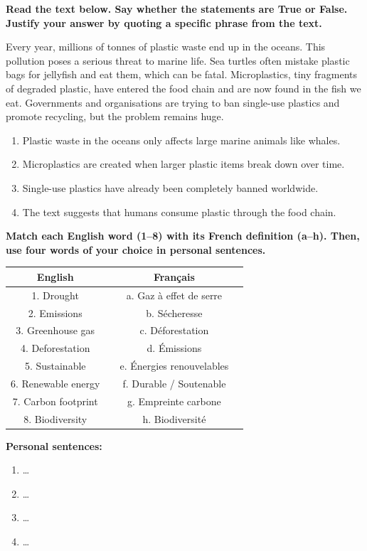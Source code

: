 \documentclass[11pt]{article}
\begin{document}
\begin{exercice}
\textbf{Read the text below. Say whether the statements are True or False. Justify your answer by quoting a specific phrase from the text.}
\begin{textebox}
Every year, millions of tonnes of plastic waste end up in the oceans. This pollution poses a serious threat to marine life. Sea turtles often mistake plastic bags for jellyfish and eat them, which can be fatal. Microplastics, tiny fragments of degraded plastic, have entered the food chain and are now found in the fish we eat. Governments and organisations are trying to ban single-use plastics and promote recycling, but the problem remains huge.
\end{textebox}
\begin{enumerate}
\item Plastic waste in the oceans only affects large marine animals like whales.
\item Microplastics are created when larger plastic items break down over time.
\item Single-use plastics have already been completely banned worldwide.
\item The text suggests that humans consume plastic through the food chain.
\end{enumerate}
\end{exercice}

\begin{exercice}
\textbf{Match each English word (1--8) with its French definition (a--h). Then, use four words of your choice in personal sentences.}
\begin{center}
\begin{tabular}{|c|l|c|l|}
\hline
\textbf{English} & & \textbf{Français} & \\
\hline
1. Drought & & a. Gaz à effet de serre \\
2. Emissions & & b. Sécheresse \\
3. Greenhouse gas & & c. Déforestation \\
4. Deforestation & & d. Émissions \\
5. Sustainable & & e. Énergies renouvelables \\
6. Renewable energy & & f. Durable / Soutenable \\
7. Carbon footprint & & g. Empreinte carbone \\
8. Biodiversity & & h. Biodiversité \\
\hline
\end{tabular}
\end{center}
\textbf{Personal sentences:}
\begin{enumerate}
\item \dots
\item \dots
\item \dots
\item \dots
\end{enumerate}
\end{exercice}
\end{document}
